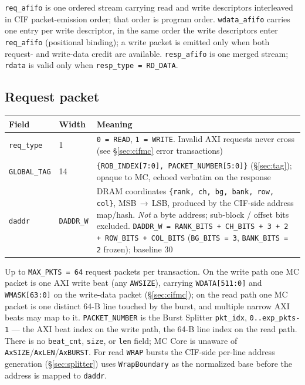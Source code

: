 \noindent \texttt{req\_afifo} is one ordered stream carrying read and write
descriptors interleaved in CIF packet-emission order; that order is program
order.  \texttt{wdata\_afifo} carries one entry per write descriptor, in the
same order the write descriptors enter \texttt{req\_afifo} (positional
binding); a write packet is emitted only when both request- and write-data
credit are available.  \texttt{resp\_afifo} is one merged stream;
\texttt{rdata} is valid only when \texttt{resp\_type = RD\_DATA}.

\subsection{Request packet}

\begin{center}
\begin{tabular}{lp{1.6cm}p{8.4cm}}
\toprule
\textbf{Field} & \textbf{Width} & \textbf{Meaning}\\
\midrule
\texttt{req\_type}   & 1 & \texttt{0 = READ}, \texttt{1 = WRITE}.  Invalid AXI requests never cross (see \S\ref{sec:cifmc} error transactions)\\
\texttt{GLOBAL\_TAG} & 14 & \texttt{\{ROB\_INDEX[7:0], PACKET\_NUMBER[5:0]\}} (\S\ref{sec:tag}); opaque to MC, echoed verbatim on the response\\
\texttt{daddr}       & \texttt{DADDR\_W} & DRAM coordinates \texttt{\{rank, ch, bg, bank, row, col\}}, MSB\,$\to$\,LSB, produced by the CIF-side address map/hash.  \emph{Not} a byte address; sub-block / offset bits excluded.  \texttt{DADDR\_W = RANK\_BITS + CH\_BITS + 3 + 2 + ROW\_BITS + COL\_BITS} (\texttt{BG\_BITS = 3}, \texttt{BANK\_BITS = 2} frozen); baseline 30\\
\bottomrule
\end{tabular}
\end{center}

\noindent Up to \texttt{MAX\_PKTS = 64} request packets per transaction.  On
the write path one MC packet is one AXI write beat (any \texttt{AWSIZE}),
carrying \texttt{WDATA[511:0]} and \texttt{WMASK[63:0]} on the write-data
packet (\S\ref{sec:cifmc}); on the read path one MC packet is one distinct
64-B line touched by the burst, and multiple narrow AXI beats may map to it.
\texttt{PACKET\_NUMBER} is the Burst Splitter \texttt{pkt\_idx},
\texttt{0..exp\_pkts-1} --- the AXI beat index on the write path, the 64-B
line index on the read path.  There is no \texttt{beat\_cnt}, \texttt{size},
or \texttt{len} field; MC Core is unaware of
\texttt{AxSIZE}/\texttt{AxLEN}/\texttt{AxBURST}.  For read \texttt{WRAP}
bursts the CIF-side per-line address generation (\S\ref{sec:splitter}) uses
\texttt{WrapBoundary} as the normalized base before the address is mapped to
\texttt{daddr}.

